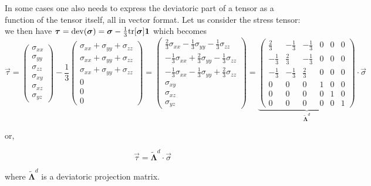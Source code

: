 In some cases one also needs to express the deviatoric part of a tensor as a function 
of the tensor itself, all in vector format. Let us consider the stress tensor: 
we then have ${\bm \tau}={\rm dev}({\bm \sigma}) = {\bm \sigma} - 
\frac{1}{3} {\rm tr}[ {\bm \sigma} ] {\bm 1}$ which becomes
\[
\vec{\tau}=
\left( \begin{array}{c}
\sigma_{xx}\\
\sigma_{yy}\\
\sigma_{zz}\\
\sigma_{xy}\\
\sigma_{xz}\\
\sigma_{yz}
\end{array} \right)
-\frac{1}{3}
\left( \begin{array}{c}
\sigma_{xx} + \sigma_{yy}+\sigma_{zz} \\
\sigma_{xx} + \sigma_{yy}+\sigma_{zz} \\
\sigma_{xx} + \sigma_{yy}+\sigma_{zz} \\
0 \\
0 \\
0
\end{array} \right)
\! = \!
\left( \begin{array}{c}
 \frac23\sigma_{xx}-\frac13 \sigma_{yy}-\frac13 \sigma_{zz} \\
-\frac13\sigma_{xx}+\frac23 \sigma_{yy}-\frac13 \sigma_{zz} \\
-\frac13\sigma_{xx}-\frac13 \sigma_{yy}+\frac23 \sigma_{zz} \\
\sigma_{xy}\\
\sigma_{xz}\\
\sigma_{yz}
\end{array} \right)
\! = \!
\underbrace{
\left( \begin{array}{cccccc}
\frac23 & - \frac13 & - \frac13 & 0 & 0 & 0 \\
-\frac13 & \frac23 & - \frac13  & 0 & 0 & 0\\
-\frac13& - \frac13 & \frac23  & 0 & 0 & 0\\
0&0&0& 1&0 &0  \\
0&0&0&0&1 &0\\
0&0&0&0&0& 1
\end{array} \right)
}_{\tilde{\bm \Lambda}^d}
\cdot
\vec{\sigma}
\]




or, 
\begin{mdframed}[backgroundcolor=blue!5]
\begin{equation}
\vec{\tau} = \tilde{\bm \Lambda}^d \cdot \vec{\sigma}
\label{eq:el:opla1}
\end{equation}
\end{mdframed}
where $\tilde{\bm \Lambda}^d$ is a deviatoric projection matrix.




